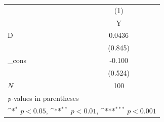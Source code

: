 {
\def\sym#1{\ifmmode^{#1}\else\(^{#1}\)\fi}
\begin{tabular}{l*{1}{c}}
\hline\hline
            &\multicolumn{1}{c}{(1)}\\
            &\multicolumn{1}{c}{Y}\\
\hline
D           &      0.0436         \\
            &     (0.845)         \\
[1em]
\_cons      &      -0.100         \\
            &     (0.524)         \\
\hline
\(N\)       &         100         \\
\hline\hline
\multicolumn{2}{l}{\footnotesize \textit{p}-values in parentheses}\\
\multicolumn{2}{l}{\footnotesize \sym{*} \(p<0.05\), \sym{**} \(p<0.01\), \sym{***} \(p<0.001\)}\\
\end{tabular}
}
